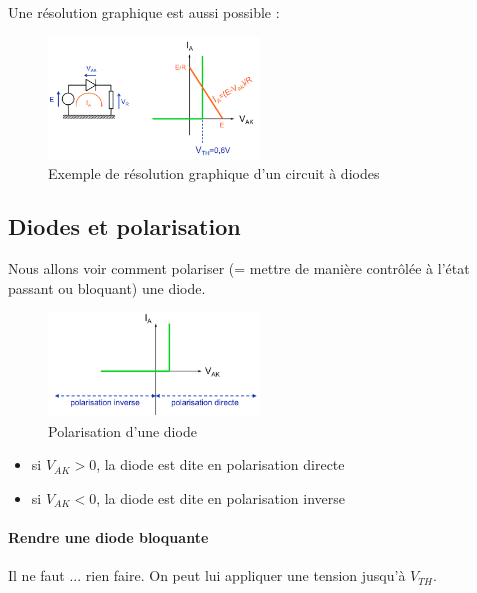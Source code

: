 \documentclass[a4paper]{article}
\begin{document}
    Une résolution graphique est aussi possible :
    \begin{figure}[H]
        \begin{center}
            \includegraphics[width=0.5\textwidth]{fig/5_diodecircuitexemplegraphique.png}
            \caption{Exemple de résolution graphique d'un circuit à diodes}
            \label{fig:5_diodecircuitexemplegraphique}
        \end{center}
    \end{figure}

    \subsection{Diodes et polarisation}
    Nous allons voir comment polariser (= mettre de manière contrôlée à l'état passant ou bloquant) une diode.

    \begin{figure}[H]
        \begin{center}
            \includegraphics[width=0.5\textwidth]{fig/5_diodepolarisation.png}
            \caption{Polarisation d'une diode}
            \label{fig:5_diodepolarisation}
        \end{center}
    \end{figure}
    \begin{itemize}
        \item si $V_{AK} > 0$, la diode est dite en polarisation directe
        \item si $V_{AK} < 0$, la diode est dite en polarisation inverse
    \end{itemize}

    \paragraph{Rendre une diode bloquante}
    Il ne faut ... rien faire. On peut lui appliquer une tension jusqu'à $V_{TH}$.
\end{document}
